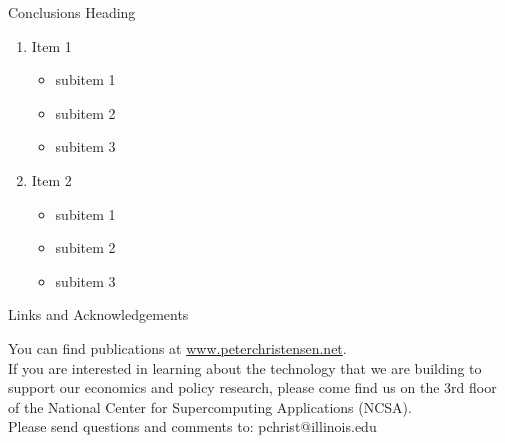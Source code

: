 \documentclass[newPxFont]{beamer}
\begin{document}

\begin{frame}[c]{Conclusions}
	Heading
	\begin{enumerate}   
		\item{Item 1}  
		\begin{itemize}
			\item{subitem 1}
			\item{subitem 2}
			\item{subitem 3}
		\end{itemize}
		\item{Item 2}
		\begin{itemize}
			\item{subitem 1}
			\item{subitem 2}
			\item{subitem 3}
		\end{itemize}
	\end{enumerate}	
\end{frame}

%
%

\begin{frame}{Links and Acknowledgements}
	
You can find publications at \url{www.peterchristensen.net}.\\
\vspace{1em}
If you are interested in learning about the technology that we are building to support our economics and policy research, please come find us on the 3rd floor of the National Center for Supercomputing Applications (NCSA).\\
\vspace{1em}	
Please send questions and comments to: pchrist@illinois.edu
\end{frame}
\end{document}
